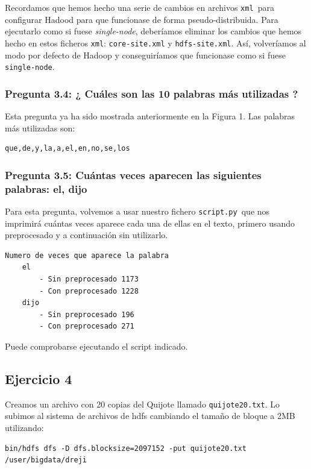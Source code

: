 \documentclass[11pt]{article}
\def\inline{\lstinline[basicstyle=\ttfamily,keywordstyle={}]}
\begin{document}
Recordamos que hemos hecho una serie de cambios en archivos \inline{xml }para configurar Hadood para que funcionase de forma pseudo-distribuida. Para ejecutarlo como si fuese \emph{single-node}, deberíamos eliminar los cambios que hemos hecho en estos ficheros  \inline{xml}:  \inline{core-site.xml} y  \inline{hdfs-site.xml}. Así, volveríamos al modo por defecto de Hadoop y conseguiríamos que funcionase como si fuese  \inline{single-node}.


\subsubsection*{ Pregunta 3.4: ¿ Cuáles son las 10 palabras más utilizadas ? }

Esta pregunta ya ha sido mostrada anteriormente en la Figura 1. Las palabras más utilizadas son:

\begin{verbatim}
que,de,y,la,a,el,en,no,se,los
\end{verbatim}

\subsubsection*{ Pregunta 3.5:  Cuántas veces aparecen las siguientes palabras: el, dijo }

Para esta pregunta, volvemos a usar nuestro fichero \inline{script.py }que nos imprimirá cuántas veces aparece cada una de ellas en el texto, primero usando preprocesado y a continuación sin utilizarlo.

\begin{verbatim}
Numero de veces que aparece la palabra
    el
        - Sin preprocesado 1173
        - Con preprocesado 1228
    dijo
        - Sin preprocesado 196
        - Con preprocesado 271
\end{verbatim}

Puede comprobarse ejecutando el script indicado.

\subsection{ Ejercicio 4 }

Creamos un archivo con 20 copias del Quijote llamado  \inline{quijote20.txt}. Lo subimos al sistema de archivos de hdfs cambiando el tamaño de bloque a 2MB utilizando:

\begin{verbatim}
bin/hdfs dfs -D dfs.blocksize=2097152 -put quijote20.txt /user/bigdata/dreji
\end{verbatim}
\end{document}
